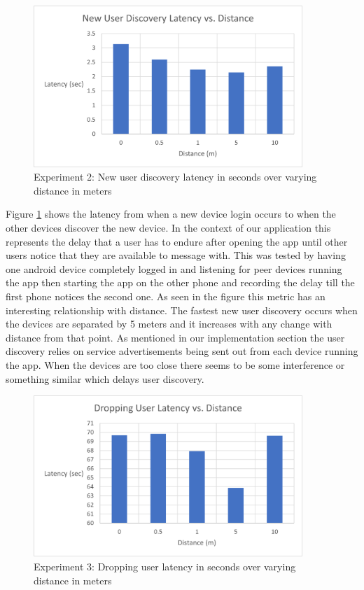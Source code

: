 \documentclass[10pt]{article}
\begin{document}
\begin{figure}[h!]
    \centering
    \includegraphics[width=4in]{new_user_dicovery_graph.png}
    \caption{Experiment 2: New user discovery latency in seconds over varying distance in meters}
    \label{results:new_user}
\end{figure}

Figure \ref{results:new_user} shows the latency from when a new device login occurs to when the other devices discover the new device. In the context of our application this represents the delay that a user has to endure after opening the app until other users notice that they are available to message with. This was tested by having one android device completely logged in and listening for peer devices running the app then starting the app on the other phone and recording the delay till the first phone notices the second one. As seen in the figure this metric has an interesting relationship with distance. The fastest new user discovery occurs when the devices are separated by 5 meters and it increases with any change with distance from that point. As mentioned in our implementation section the user discovery relies on service advertisements being sent out from each device running the app. When the devices are too close there seems to be some interference or something similar which delays user discovery.

\begin{figure}[h!]
    \centering
    \includegraphics[width=4in]{dropping_user_latency_graph.png}
    \caption{Experiment 3: Dropping user latency in seconds over varying distance in meters}
    \label{results:dropping_user}
\end{figure}
\end{document}
